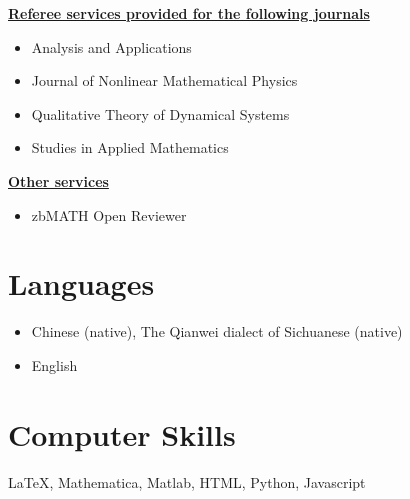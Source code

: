 \documentclass[12pt,a4paper]{article}
\begin{document}
\begin{cv}{}
\noindent \textbf{\underline{Referee services provided for the following journals}}
\begin{itemize}
    \item Analysis and Applications
    \item Journal of Nonlinear Mathematical Physics
    \item Qualitative Theory of Dynamical Systems
    \item Studies in Applied Mathematics
\end{itemize}
\vspace{1em}

\noindent \textbf{\underline{Other services}}
\begin{itemize}
    \item zbMATH Open Reviewer
\end{itemize}



\section{Languages}
\begin{itemize}
\item Chinese (native), The Qianwei dialect of Sichuanese (native)
\item English
\end{itemize}


\section{Computer Skills}
\LaTeX, Mathematica, Matlab, HTML, Python, Javascript


\end{cv}
\end{document}
